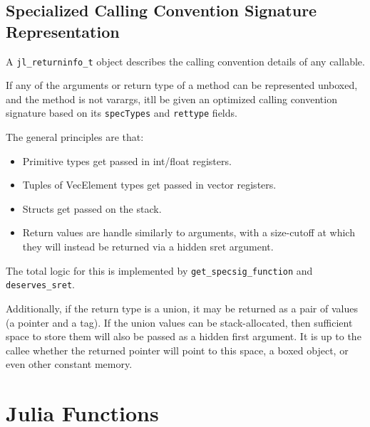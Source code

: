 \hypertarget{5801902447580234191}{}


\subsection{Specialized Calling Convention Signature Representation}



A \texttt{jl\_returninfo\_t} object describes the calling convention details of any callable.



If any of the arguments or return type of a method can be represented unboxed, and the method is not varargs, it{\textquotesingle}ll be given an optimized calling convention signature based on its \texttt{specTypes} and \texttt{rettype} fields.



The general principles are that:



\begin{itemize}
\item Primitive types get passed in int/float registers.


\item Tuples of VecElement types get passed in vector registers.


\item Structs get passed on the stack.


\item Return values are handle similarly to arguments, with a size-cutoff at which they will instead be returned via a hidden sret argument.

\end{itemize}


The total logic for this is implemented by \texttt{get\_specsig\_function} and \texttt{deserves\_sret}.



Additionally, if the return type is a union, it may be returned as a pair of values (a pointer and a tag). If the union values can be stack-allocated, then sufficient space to store them will also be passed as a hidden first argument. It is up to the callee whether the returned pointer will point to this space, a boxed object, or even other constant memory.



\hypertarget{16329287024252296077}{}


\section{Julia Functions}



